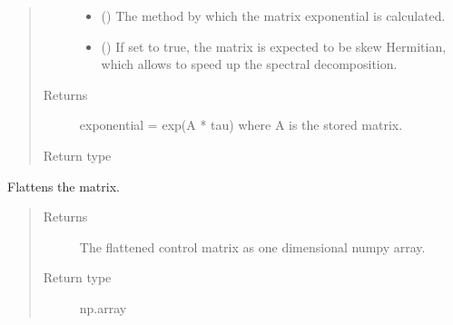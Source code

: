 \documentclass[letterpaper,10pt,english]{sphinxmanual}
\begin{document}
\begin{fulllineitems}
\begin{fulllineitems}
\begin{quote}
\begin{description}
\begin{itemize}
\item {} 
 (\sphinxstyleliteralemphasis{\sphinxupquote{, }}) \textendash{} The method by which the matrix exponential is calculated.

\item {} 
 () \textendash{} If set to true, the matrix is expected to be skew Hermitian, which
allows to speed up the spectral decomposition.

\end{itemize}

\item[{Returns}] \leavevmode
{} \textendash{} exponential = exp(A * tau) where A is the stored matrix.

\item[{Return type}] \leavevmode
{\hyperref[\detokenize{qsim:qsim.matrix.OperatorMatrix}]{}}

\end{description}\end{quote}

\end{fulllineitems}


\begin{fulllineitems}
\label{\detokenize{qsim:qsim.matrix.OperatorMatrix.flatten}}
Flattens the matrix.
\begin{quote}\begin{description}
\item[{Returns}] \leavevmode
{} \textendash{} The flattened control matrix as one dimensional numpy array.

\item[{Return type}] \leavevmode
np.array

\end{description}\end{quote}

\end{fulllineitems}


\end{fulllineitems}
\end{document}
